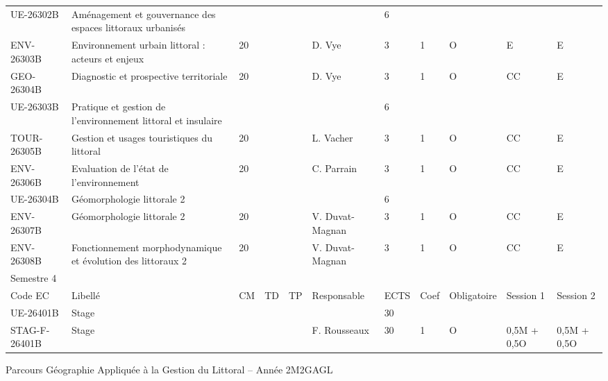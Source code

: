\documentclass[a4paper,11pt]{article}
\begin{document}
{{\begin{tabular}{lllllllllll}
\rowcolor[HTML]{C0C0C0} 
UE-26302B     & Aménagement et gouvernance des espaces littoraux urbanisés                     &    &    &    &                 & 6    &      &             &                &             \\
ENV-26303B    & Environnement urbain littoral : acteurs et enjeux                              & 20 &    &    & D. Vye          & 3    & 1    & O           & E              & E           \\
GEO-26304B    & Diagnostic et prospective territoriale                                         & 20 &    &    & D. Vye          & 3    & 1    & O           & CC             & E           \\
\rowcolor[HTML]{C0C0C0} 
UE-26303B     & Pratique et gestion de l'environnement littoral et insulaire                   &    &    &    &                 & 6    &      &             &                &             \\
TOUR-26305B   & Gestion et usages touristiques du littoral                                     & 20 &    &    & L. Vacher       & 3    & 1    & O           & CC             & E           \\
ENV-26306B    & Evaluation de l'état de l'environnement                                        & 20 &    &    & C. Parrain      & 3    & 1    & O           & CC             & E           \\
\rowcolor[HTML]{C0C0C0} 
UE-26304B     & Géomorphologie littorale 2                                                     &    &    &    &                 & 6    &      &             &                &             \\
ENV-26307B    & Géomorphologie littorale 2                                                     & 20 &    &    & V. Duvat-Magnan & 3    & 1    & O           & CC             & E           \\
ENV-26308B    & Fonctionnement morphodynamique et évolution des littoraux 2                    & 20 &    &    & V. Duvat-Magnan & 3    & 1    & O           & CC             & E           \\
\rowcolor[HTML]{656565} 
Semestre 4    &                                                                                &    &    &    &                 &      &      &             &                &             \\
\rowcolor[HTML]{9B9B9B} 
Code EC       & Libellé                                                                        & CM & TD & TP & Responsable     & ECTS & Coef & Obligatoire & Session 1      & Session 2   \\
\rowcolor[HTML]{C0C0C0} 
UE-26401B     & Stage                                                                          &    &    &    &                 & 30   &      &             &                &             \\
STAG-F-26401B & Stage                                                                          &    &    &    & F. Rousseaux    & 30   & 1    & O           & 0,5M + 0,5O    & 0,5M + 0,5O
\end{tabular}}
}{Parcours Géographie Appliquée à la Gestion du Littoral -- Année 2}{M2GAGL}
\end{document}
